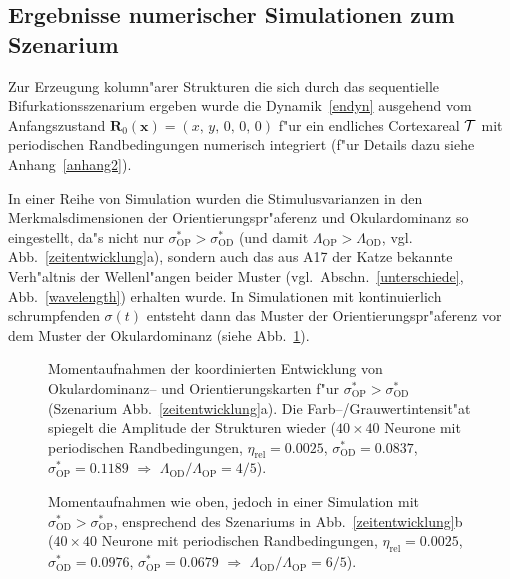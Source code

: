 \subsection{Ergebnisse numerischer Simulationen zum Szenarium}
\label{numerg}

Zur Erzeugung kolumn"arer Strukturen die sich durch das sequentielle
Bifurkationsszenarium ergeben wurde die Dynamik~\eqref{endyn} ausgehend vom
Anfangszustand $\mathbf{R}_0(\mathbf{x}) = (x,\, y,\, 0,\, 0,\, 0) $ f"ur
ein endliches Cortexareal $\cal T$ mit periodischen Randbedingungen
numerisch integriert (f"ur Details dazu siehe Anhang~\ref{anhang2}).

In einer Reihe von  Simulation  wurden die Stimulusvarianzen in den
Merkmalsdimensionen der Orientierungspr"aferenz und Okulardominanz  so
eingestellt, da"s nicht nur $\sigma^\ast_{\text{OP}}>\sigma^\ast_{\text{OD}}$
(und damit $\Lambda_{\text{OP}} > \Lambda_{\text{OD}}$,
vgl. Abb.~\ref{zeitentwicklung}a), sondern auch
das aus A17 der Katze bekannte Verh"altnis der Wellenl"angen beider
Muster (vgl.~Abschn.~\ref{unterschiede}, Abb.~\ref{wavelength})
erhalten wurde.  In Simulationen mit kontinuierlich schrumpfenden
$\sigma(t)$ entsteht dann das Muster der Orientierungspr"aferenz vor dem
Muster der Okulardominanz (siehe Abb.~\ref{opod}).

\begin{figure}[p]
\begin{center}
\begin{sideways}
\end{sideways}
\end{center}
\caption{Momentaufnahmen der koordinierten Entwicklung von Okular\-do\-minanz--
und Orientierungskarten f"ur
$\sigma^\ast_{\text{OP}}>\sigma^\ast_{\text{OD}}$ (Szenarium
Abb.~\ref{zeitentwicklung}a). Die Farb--/Grauwertintensit"at spiegelt
die Amplitude der Strukturen wieder ($40\times 40$ Neurone mit periodischen
Randbedingungen, $\eta_{\text{rel}}=0.0025$,
$\sigma^\ast_{\text{OD}}=0.0837$, $\sigma^\ast_{\text{OP}}=0.1189$
$\Longrightarrow$ $\Lambda_{\text{OD}}/\Lambda_{\text{OP}}=4/5$).}
\label{opod}
\end{figure}

\begin{figure}[p]
\begin{center}
\begin{sideways}
\end{sideways}
\end{center}
\caption{Momentaufnahmen wie oben, jedoch in einer Simulation mit
$\sigma^\ast_{\text{OD}}>\sigma^\ast_{\text{OP}}$, ensprechend des Szenariums in
Abb.~\ref{zeitentwicklung}b ($40\times 40$ Neurone mit
periodischen Randbedingungen, $\eta_{\text{rel}}= 0.0025$,
$\sigma^\ast_{\text{OD}}=0.0976$, $\sigma^\ast_{\text{OP}}=0.0679$
$\Longrightarrow$ $\Lambda_{\text{OD}}/\Lambda_{\text{OP}}=6/5$).}
\label{odop}
\end{figure}

